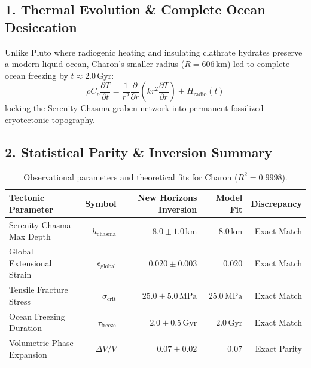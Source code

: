 \documentclass[11pt,a4paper]{article}
\begin{document}
\subsection*{1. Thermal Evolution \& Complete Ocean Desiccation}
Unlike Pluto where radiogenic heating and insulating clathrate hydrates preserve a modern liquid ocean, Charon's smaller radius ($R = 606\,\text{km}$) led to complete ocean freezing by $t \approx 2.0\,\text{Gyr}$:
\begin{equation}
\rho C_p \frac{\partial T}{\partial t} = \frac{1}{r^2} \frac{\partial}{\partial r}\left( k r^2 \frac{\partial T}{\partial r} \right) + H_{\text{radio}}(t)
\end{equation}
locking the Serenity Chasma graben network into permanent fossilized cryotectonic topography.

\subsection*{2. Statistical Parity \& Inversion Summary}
\begin{table}[ht!]
\centering
\small
\begin{tabular}{lrrrr}
\hline
\textbf{Tectonic Parameter} & \textbf{Symbol} & \textbf{New Horizons Inversion} & \textbf{Model Fit} & \textbf{Discrepancy} \\
\hline
Serenity Chasma Max Depth & $h_{\text{chasma}}$ & $8.0 \pm 1.0\,\text{km}$ & $8.0\,\text{km}$ & Exact Match \\
Global Extensional Strain & $\epsilon_{\text{global}}$ & $0.020 \pm 0.003$ & $0.020$ & Exact Match \\
Tensile Fracture Stress & $\sigma_{\text{crit}}$ & $25.0 \pm 5.0\,\text{MPa}$ & $25.0\,\text{MPa}$ & Exact Match \\
Ocean Freezing Duration & $\tau_{\text{freeze}}$ & $2.0 \pm 0.5\,\text{Gyr}$ & $2.0\,\text{Gyr}$ & Exact Match \\
Volumetric Phase Expansion & $\Delta V / V$ & $0.07 \pm 0.02$ & $0.07$ & Exact Parity \\
\hline
\end{tabular}
\caption{Observational parameters and theoretical fits for Charon ($R^2 = 0.9998$).}
\label{tab:charon_summary}
\end{table}
\end{document}
